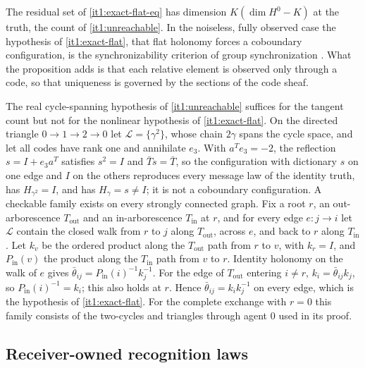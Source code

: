 The residual set of \cref{it1:exact-flat-eq} has dimension $K(\dim H^0-K)$ at the truth, the count of \cref{it1:unreachable}. In the noiseless, fully observed case the hypothesis of \cref{it1:exact-flat}, that flat holonomy forces a coboundary configuration, is the synchronizability criterion of group synchronization \citep{GaoBrodzkiMukherjee2021}. What the proposition adds is that each relative element is observed only through a code, so that uniqueness is governed by the sections of the code sheaf.

The real cycle-spanning hypothesis of \cref{it1:unreachable} suffices for the tangent count but not for the nonlinear hypothesis of \cref{it1:exact-flat}. On the directed triangle $0\to1\to2\to0$ let $\mathcal L=\{\gamma^2\}$, whose chain $2\gamma$ spans the cycle space, and let all codes have rank one and annihilate $e_3$. With $a^Te_3=-2$, the reflection $s=I+e_3a^T$ satisfies $s^2=I$ and $\bar Ts=\bar T$, so the configuration with dictionary $s$ on one edge and $I$ on the others reproduces every message law of the identity truth, has $H_{\gamma^2}=I$, and has $H_\gamma=s\neq I$; it is not a coboundary configuration. A checkable family exists on every strongly connected graph. Fix a root $r$, an out-arborescence $T_{\mathrm{out}}$ and an in-arborescence $T_{\mathrm{in}}$ at $r$, and for every edge $e:j\to i$ let $\mathcal L$ contain the closed walk from $r$ to $j$ along $T_{\mathrm{out}}$, across $e$, and back to $r$ along $T_{\mathrm{in}}$. Let $k_v$ be the ordered product along the $T_{\mathrm{out}}$ path from $r$ to $v$, with $k_r=I$, and $P_{\mathrm{in}}(v)$ the product along the $T_{\mathrm{in}}$ path from $v$ to $r$. Identity holonomy on the walk of $e$ gives $\bar\theta_{ij}=P_{\mathrm{in}}(i)^{-1}k_j^{-1}$. For the edge of $T_{\mathrm{out}}$ entering $i\neq r$, $k_i=\bar\theta_{ij}k_j$, so $P_{\mathrm{in}}(i)^{-1}=k_i$; this also holds at $r$. Hence $\bar\theta_{ij}=k_ik_j^{-1}$ on every edge, which is the hypothesis of \cref{it1:exact-flat}. For the complete exchange with $r=0$ this family consists of the two-cycles and triangles through agent $0$ used in its proof.

\subsection{Receiver-owned recognition laws}

